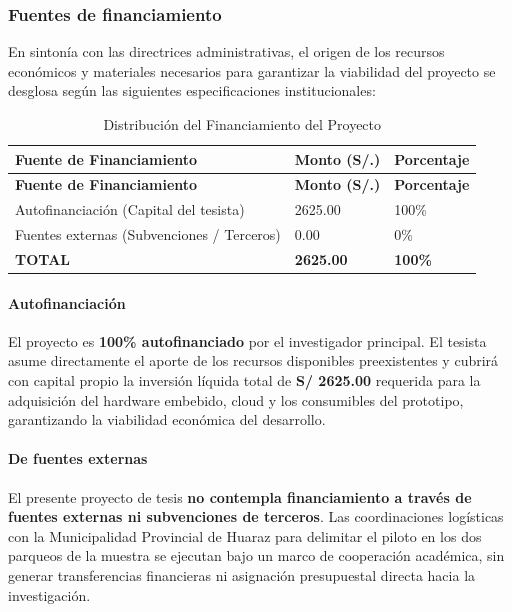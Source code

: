 \documentclass[12pt,a4paper]{article}
\begin{document}
\subsubsection{Fuentes de financiamiento}

En sintonía con las directrices administrativas, el origen de los recursos económicos y materiales necesarios para garantizar la viabilidad del proyecto se desglosa según las siguientes especificaciones institucionales:

\begingroup
\small

\begin{longtable}{@{} p{} p{} p{} @{}}
	\caption{Distribución del Financiamiento del Proyecto} \label{tab:distribucion-financiamiento} \\
	\toprule
	\textbf{Fuente de Financiamiento} & \textbf{Monto (S/.)} & \textbf{Porcentaje} \\
	\midrule
	\endfirsthead
	
	\toprule
	\textbf{Fuente de Financiamiento} & \textbf{Monto (S/.)} & \textbf{Porcentaje} \\
	\midrule
	\endhead
	
	\bottomrule
	\endlastfoot
	
	Autofinanciación (Capital del tesista) & 2625.00 & 100\% \\
	Fuentes externas (Subvenciones / Terceros) & 0.00 & 0\% \\
	\addlinespace
	\midrule
	\textbf{TOTAL} & \textbf{2625.00} & \textbf{100\%} \\
\end{longtable}
\endgroup

\paragraph{Autofinanciación}
El proyecto es \textbf{100\% autofinanciado} por el investigador principal. El tesista asume directamente el aporte de los recursos disponibles preexistentes y cubrirá con capital propio la inversión líquida total de \textbf{S/ 2625.00} requerida para la adquisición del hardware embebido, cloud y los consumibles del prototipo, garantizando la viabilidad económica del desarrollo.

\paragraph{De fuentes externas}
El presente proyecto de tesis \textbf{no contempla financiamiento a través de fuentes externas ni subvenciones de terceros}. Las coordinaciones logísticas con la Municipalidad Provincial de Huaraz para delimitar el piloto en los dos parqueos de la muestra se ejecutan bajo un marco de cooperación académica, sin generar transferencias financieras ni asignación presupuestal directa hacia la investigación.
\end{document}
